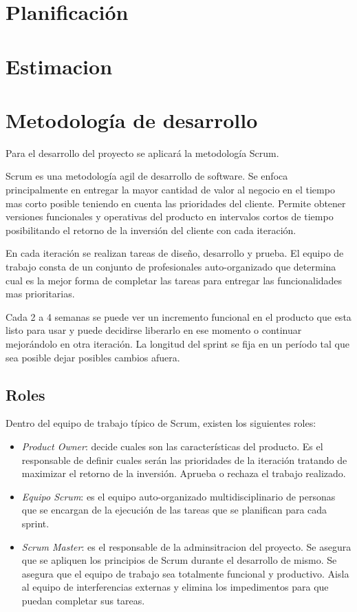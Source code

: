 \documentclass[12pt,a4paper]{article}
\begin{document}
	\section{Planificación}
	\section{Estimacion}
	\section{Metodología de desarrollo}
	
	Para el desarrollo del proyecto se aplicará la metodología Scrum.

	Scrum es una metodología agil de desarrollo de software. Se enfoca principalmente en entregar la mayor cantidad de valor al negocio en el tiempo mas corto posible teniendo en cuenta las prioridades del cliente. Permite obtener versiones funcionales y operativas del producto en intervalos cortos de tiempo posibilitando el retorno de la inversión del cliente con cada iteración.
	
	En cada iteración se realizan tareas de diseño, desarrollo y prueba. El equipo de trabajo consta de un conjunto de profesionales auto-organizado que determina cual es la mejor forma de completar las tareas para entregar las funcionalidades mas prioritarias.
	
	Cada 2 a 4 semanas se puede ver un incremento funcional en el producto que esta listo para usar y puede decidirse liberarlo en ese momento o continuar mejorándolo en otra iteración. La longitud del sprint se fija en un período tal que sea posible dejar posibles cambios afuera.

	\subsection{Roles}

	Dentro del equipo de trabajo típico de Scrum, existen los siguientes roles:
	
	\begin{itemize}
	\item \textit{Product Owner}: decide cuales son las características del producto. Es el responsable de definir cuales serán las prioridades de la iteración tratando de maximizar el retorno de la inversión. Aprueba o rechaza el trabajo realizado.

	\item \textit{Equipo Scrum}: es el equipo auto-organizado multidisciplinario de personas que se encargan de la ejecución de las tareas que se planifican para cada sprint.

	\item \textit{Scrum Master}: es el responsable de la adminsitracion del proyecto. Se asegura que se apliquen los principios de Scrum durante el desarrollo de mismo. Se asegura que el equipo de trabajo sea totalmente funcional y productivo. Aisla al equipo de interferencias externas y elimina los impedimentos para que puedan completar sus tareas.
	
	\end{itemize}
\end{document}
